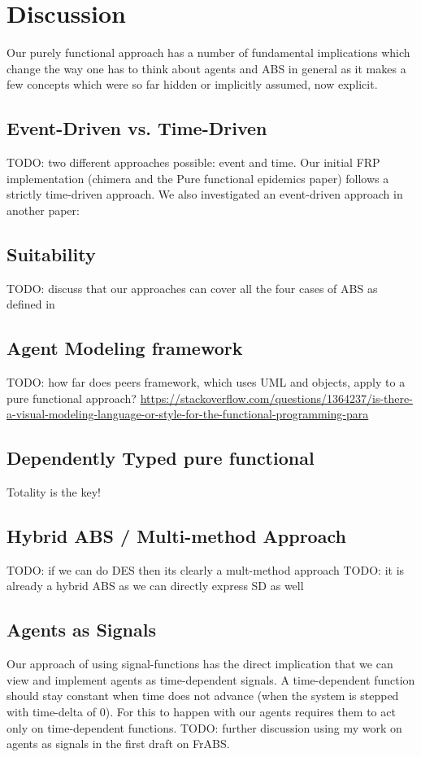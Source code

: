 \section{Discussion}
Our purely functional approach has a number of fundamental implications which change the way one has to think about agents and ABS in general as it makes a few concepts which were so far hidden or implicitly assumed, now explicit. 

\subsection{Event-Driven vs. Time-Driven}
TODO: two different approaches possible: event and time. Our initial FRP implementation (chimera and the Pure functional epidemics paper) follows a strictly time-driven approach. We also investigated an event-driven approach in another paper: 

\subsection{Suitability}
TODO: discuss that our approaches can cover all the four cases of ABS as defined in \cite{macal_everything_2016}

\subsection{Agent Modeling framework}
TODO: how far does peers framework, which uses UML and objects, apply to a pure functional approach?  \url{https://stackoverflow.com/questions/1364237/is-there-a-visual-modeling-language-or-style-for-the-functional-programming-para}

\subsection{Dependently Typed pure functional}
Totality is the key!

\subsection{Hybrid ABS / Multi-method Approach}
TODO: if we can do DES then its clearly a mult-method approach
TODO: it is already a hybrid ABS as we can directly express SD as well

\subsection{Agents as Signals}
Our approach of using signal-functions has the direct implication that we can view and implement agents as time-dependent signals. A time-dependent function should stay constant when time does not advance (when the system is stepped with time-delta of 0). For this to happen with our agents requires them to act only on time-dependent functions. TODO: further discussion using my work on agents as signals in the first draft on FrABS.


